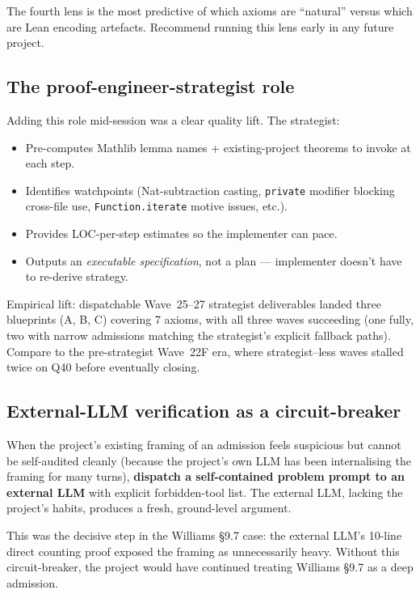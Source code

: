 \documentclass[11pt,a4paper]{article}
\theoremstyle{plain}
\theoremstyle{definition}
\begin{document}
The fourth lens is the most predictive of which axioms are
``natural'' versus which are Lean encoding artefacts. Recommend
running this lens early in any future project.

\subsection{The proof-engineer-strategist role}

Adding this role mid-session was a clear quality lift. The strategist:
\begin{itemize}[leftmargin=1.5em]
\item Pre-computes Mathlib lemma names + existing-project theorems to
      invoke at each step.
\item Identifies watchpoints (Nat-subtraction casting, \verb|private|
      modifier blocking cross-file use, \verb|Function.iterate| motive
      issues, etc.).
\item Provides LOC-per-step estimates so the implementer can pace.
\item Outputs an \emph{executable specification}, not a plan ---
      implementer doesn't have to re-derive strategy.
\end{itemize}

Empirical lift: dispatchable Wave~25--27 strategist deliverables
landed three blueprints (A, B, C) covering 7 axioms, with all three
waves succeeding (one fully, two with narrow admissions matching the
strategist's explicit fallback paths). Compare to the pre-strategist
Wave~22F era, where strategist--less waves stalled twice on Q40
before eventually closing.

\subsection{External-LLM verification as a circuit-breaker}

When the project's existing framing of an admission feels suspicious
but cannot be self-audited cleanly (because the project's own LLM has
been internalising the framing for many turns), \textbf{dispatch a
self-contained problem prompt to an external LLM} with explicit
forbidden-tool list. The external LLM, lacking the project's habits,
produces a fresh, ground-level argument.

This was the decisive step in the Williams \S 9.7 case: the external
LLM's 10-line direct counting proof exposed the framing as
unnecessarily heavy. Without this circuit-breaker, the project would
have continued treating Williams \S 9.7 as a deep admission.
\end{document}

